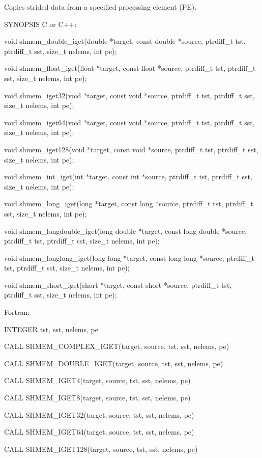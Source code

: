         Copies strided data from a specified processing
       element (PE).

SYNOPSIS
       C or C++:

	  void	shmem_double_iget(double  *target,   const   double   *source,
	  ptrdiff_t tst, ptrdiff_t sst, size_t nelems, int pe);

	  void	shmem_float_iget(float *target, const float *source, ptrdiff_t
	  tst, ptrdiff_t sst, size_t nelems, int pe);

	  void shmem_iget32(void *target, const void *source,  ptrdiff_t  tst,
	  ptrdiff_t sst, size_t nelems, int pe);

	  void	shmem_iget64(void  *target, const void *source, ptrdiff_t tst,
	  ptrdiff_t sst, size_t nelems, int pe);

	  void shmem_iget128(void *target, const void *source, ptrdiff_t  tst,
	  ptrdiff_t sst, size_t nelems, int pe);

	  void	shmem_int_iget(int  *target, const int *source, ptrdiff_t tst,
	  ptrdiff_t sst, size_t nelems, int pe);

	  void shmem_long_iget(long *target,  const  long  *source,  ptrdiff_t
	  tst, ptrdiff_t sst, size_t nelems, int pe);

	  void	shmem_longdouble_iget(long  double  *target, const long double
	  *source, ptrdiff_t tst, ptrdiff_t sst, size_t nelems, int pe);

	  void shmem_longlong_iget(long long *target, const long long *source,
	  ptrdiff_t tst, ptrdiff_t sst, size_t nelems, int pe);

	  void	shmem_short_iget(short *target, const short *source, ptrdiff_t
	  tst, ptrdiff_t sst, size_t nelems, int pe);

       Fortran:

	  INTEGER tst, sst, nelems, pe

	  CALL SHMEM_COMPLEX_IGET(target, source, tst, sst, nelems, pe)

	  CALL SHMEM_DOUBLE_IGET(target, source, tst, sst, nelems, pe)

	  CALL SHMEM_IGET4(target, source, tst, sst, nelems, pe)

	  CALL SHMEM_IGET8(target, source, tst, sst, nelems, pe)

	  CALL SHMEM_IGET32(target, source, tst, sst, nelems, pe)

	  CALL SHMEM_IGET64(target, source, tst, sst, nelems, pe)

	  CALL SHMEM_IGET128(target, source, tst, sst, nelems, pe)

